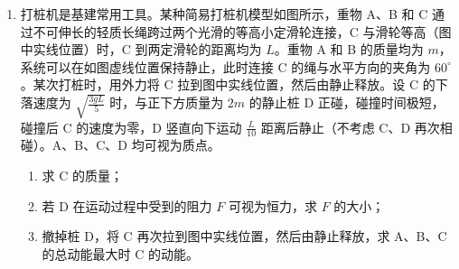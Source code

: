 \documentclass[\gkver]{gaokaozhenti}
\begin{document}
\begin{enumerate}
{	$F\sin\theta-mg-BIL=0$，$E=BLv_{y}$，$I=\frac{E}{R}$，$v_{y}^{2}=2a_{y}L$

	联立有 $B=0.2\UT$

	由题知，从 ab 边进入磁场开始，在竖直方向线框做匀速运动；dc 边进入磁场时，bc 边恰好到达磁场右边界。则线框进入磁场的整个过程中，线框受到的安培力为恒力，则有

	$Q=W_{\text{安}}=BILy$，$y=L$，$F\sin\theta-mg=BIL$

	联立解得 $Q=0.4\UJ$

	（3）线框从开始运动到进入磁场的整个过程中所用的时间为

	$v_{y}=a_{y}t_{1}$，$L=v_{y}t_{2}$，$t=t_{1}+t_{2}$

	联立解得 $t=0.3\Us$

	由（2）分析可知线框在水平方向一直做匀加速直线运动，则在水平方向有

	$x=\frac{1}{2}a_{x}t^{2}=\frac{1}{2}\times 20\times 0.3^{2}\Um=0.9\Um$

	则磁场区域的水平宽度 $X=x+L=1.1\Um$。
}

\item
打桩机是基建常用工具。某种简易打桩机模型如图所示，重物 A、B 和 C 通过不可伸长的轻质长绳跨过两个光滑的等高小定滑轮连接，C 与滑轮等高（图中实线位置）时，C 到两定滑轮的距离均为 $L$。重物 A 和 B 的质量均为 $m$，系统可以在如图虚线位置保持静止，此时连接 C 的绳与水平方向的夹角为 $60^{\circ}$。某次打桩时，用外力将 C 拉到图中实线位置，然后由静止释放。设 C 的下落速度为 $\sqrt{\frac{3gL}{5}}$ 时，与正下方质量为 $2m$ 的静止桩 D 正碰，碰撞时间极短，碰撞后 C 的速度为零，D 竖直向下运动 $\frac{L}{10}$ 距离后静止（不考虑 C、D 再次相碰）。A、B、C、D 均可视为质点。
\begin{enumerate}
	\item
	求 C 的质量；
	\item
	若 D 在运动过程中受到的阻力 $F$ 可视为恒力，求 $F$ 的大小；
	\item
	撤掉桩 D，将 C 再次拉到图中实线位置，然后由静止释放，求 A、B、C 的总动能最大时 C 的动能。
\end{enumerate}

\end{enumerate}
\end{document}
